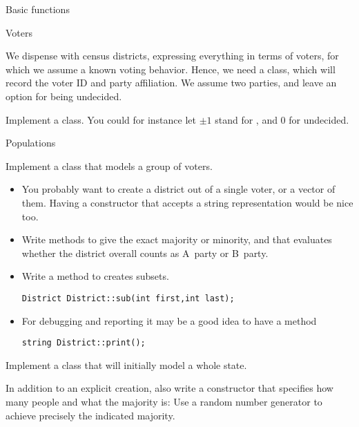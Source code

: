  {Basic functions}

 {Voters}

We dispense with census districts, expressing everything in terms of
voters, for which we assume a known voting behavior. Hence, we need a
 class, which will record the voter ID and party
affiliation. We assume two parties, and leave an option for being undecided.

\begin{exercise}
  Implement a  class. You could for instance let $\pm1$ stand
  for , and 0 for undecided.
\end{exercise}

 {Populations}

\begin{exercise}
  Implement a  class that models a group of voters.
  \begin{itemize}
    \item You probably want to create a district out of a single
      voter, or a vector of them. Having a constructor that accepts a
      string representation would be nice too.
    \item Write methods  to give the exact majority or
      minority, and  that evaluates whether the district
      overall counts as A~party or B~party.
    \item Write a  method to creates subsets.
\begin{lstlisting}
District District::sub(int first,int last);
\end{lstlisting}
  \item For debugging and reporting it may be a good idea to have a method
\begin{lstlisting}
string District::print();
\end{lstlisting}
  \end{itemize}
\end{exercise}

\begin{exercise}
  Implement a  class that will initially model a whole state.

  In addition to an explicit creation, also write a constructor that
  specifies how many people and what the majority is:
  Use a random number generator to achieve precisely the indicated majority.
\end{exercise}

